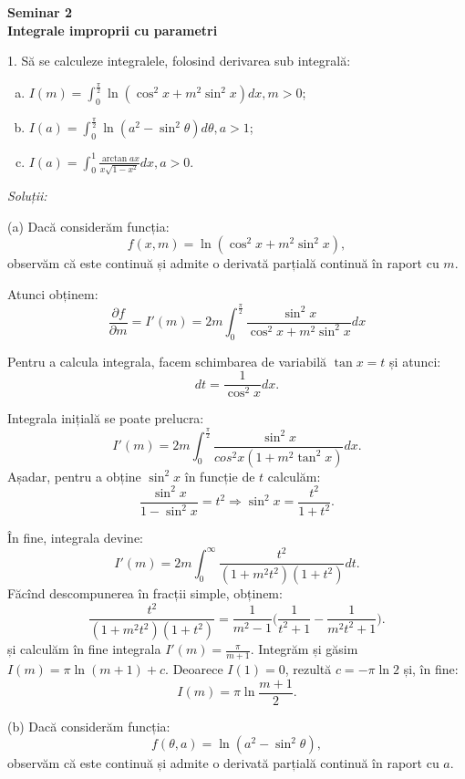\documentclass[11pt,a4paper]{article}
\newcommand\ds{\displaystyle}
\theoremstyle{dotless}
\theoremstyle{dotlessdr}
\begin{document}
\begin{center}
  {\large\textbf{Seminar 2 \\ Integrale improprii cu parametri}}
\end{center}

\vspace{1cm}

1. Să se calculeze integralele, folosind derivarea sub integrală:
\begin{enumerate}[(a)]
\item $ I(m) = \ds\int_0^{\frac{\pi}{2}} \ln(\cos^2 x + m^2 \sin^2 x) dx, m > 0 $;
\item $ I(a) = \ds\int_0^{\frac{\pi}{2}} \ln(a^2 - \sin^2 \theta) d\theta, a > 1 $;
\item $ I(a) = \ds\int_0^1 \frac{\arctan ax}{x \sqrt{1 - x^2}} dx, a > 0 $.
\end{enumerate}

\emph{Soluții:}

(a) Dacă considerăm funcția:
\[
  f(x, m) = \ln(\cos^2 x + m^2 \sin^2 x),
\]
observăm că este continuă și admite o derivată parțială continuă în raport cu $m$.

Atunci obținem:
\[
  \frac{\partial f}{\partial m} = I'(m) = 2m \int_0^{\frac{\pi}{2}} %
  \frac{\sin^2 x}{\cos^2 x + m^2 \sin^2 x} dx
\]

Pentru a calcula integrala, facem schimbarea de variabilă $\tan x = t$ și atunci:
\[
  dt = \frac{1}{\cos^2 x} dx.
\]

Integrala inițială se poate prelucra:
\[
  I'(m) = 2m \int_0^{\frac{\pi}{2}} \frac{\sin^2 x}{cos^2 x(1 + m^2 \tan^2 x)} dx.
\]
Așadar, pentru a obține $\sin^2 x$ în funcție de $t$ calculăm:
\[
  \frac{\sin^2 x}{1 - \sin^2 x} = t^2 \Rightarrow \sin^2 x = \frac{t^2}{1 + t^2}.
\]

În fine, integrala devine:
\[
  I'(m) = 2m \int_0^\infty \frac{t^2}{(1 + m^2 t^2)(1 + t^2)} dt.
\]
Făcînd descompunerea în fracții simple, obținem:
\[
  \frac{t^2}{(1 + m^2 t^2)(1 + t^2)} = \frac{1}{m^2 - 1} \Big( \frac{1}{t^2 + 1} - %
  \frac{1}{m^2 t^2 + 1} \Big).
\]
și calculăm în fine integrala $I'(m) = \frac{\pi}{m + 1}$. Integrăm și găsim
$I(m) = \pi \ln(m + 1) + c$. Deoarece $I(1) = 0$, rezultă $c = -\pi \ln 2$
și, în fine:
\[
  I(m) = \pi \ln \frac{m + 1}{2}.
\]

\vspace{1cm}

(b) Dacă considerăm funcția:
\[
  f(\theta, a) = \ln(a^2 - \sin^2 \theta),
\]
observăm că este continuă și admite o derivată parțială continuă în raport cu $a$.
\end{document}
